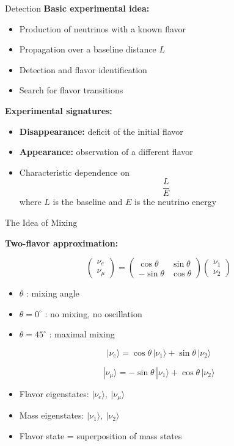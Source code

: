 \documentclass{beamer}
\begin{document}
\begin{frame}{Detection}
\textbf{Basic experimental idea:}
\begin{itemize}
  \item Production of neutrinos with a known flavor
  \item Propagation over a baseline distance $L$
  \item Detection and flavor identification
  \item Search for flavor transitions
\end{itemize}

\vspace{0.3cm}

\textbf{Experimental signatures:}
\begin{itemize}
  \item \textbf{Disappearance:} deficit of the initial flavor
  \item \textbf{Appearance:} observation of a different flavor
  \item Characteristic dependence on
  \[
  \frac{L}{E}
  \]
  where $L$ is the baseline and $E$ is the neutrino energy
\end{itemize}
\end{frame}
\begin{frame}{The Idea of Mixing}

\textbf{Two-flavor approximation:}

\[
\begin{pmatrix}
\nu_e\\
\nu_\mu
\end{pmatrix}
=
\begin{pmatrix}
\cos\theta & \sin\theta\\
-\sin\theta & \cos\theta
\end{pmatrix}
\begin{pmatrix}
\nu_1\\
\nu_2
\end{pmatrix}
\]

\begin{itemize}
    \item $\theta$ : mixing angle
    \item $\theta = 0^\circ$ : no mixing, no oscillation
    \item $\theta = 45^\circ$ : maximal mixing
\end{itemize}

\[
|\nu_e\rangle
=
\cos\theta\,|\nu_1\rangle
+
\sin\theta\,|\nu_2\rangle
\]

\[
|\nu_\mu\rangle
=
-\sin\theta\,|\nu_1\rangle
+
\cos\theta\,|\nu_2\rangle
\]

\begin{itemize}
    \item Flavor eigenstates: $|\nu_e\rangle,\ |\nu_\mu\rangle$
    \item Mass eigenstates: $|\nu_1\rangle,\ |\nu_2\rangle$
    \item Flavor state = superposition of mass states
\end{itemize}

\end{frame}
\end{document}
